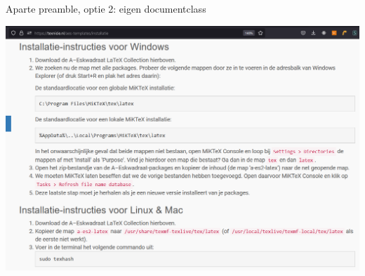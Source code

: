 \begin{frame}[fragile]{Aparte preamble, optie 2: eigen documentclass}
    \begin{center}
        \includegraphics[height=0.8\textheight]{assets/aesTemplatesManualInstallation_wide.png}
    \end{center}
\end{frame}
